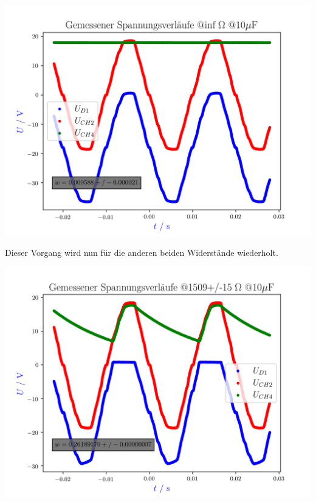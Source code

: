 \documentclass[11pt,ngerman]{scrartcl}
\begin{document}
\begin{center}
	\begin{minipage}[t]{0.8\textwidth}
		\includegraphics[width=\textwidth]{./figures/halbleiter/Versuch3/spannunginf.png}
		\label{fig:spannunginf}
	\end{minipage}
\end{center}

Dieser Vorgang wird nun für die anderen beiden Widerstände wiederholt.

\begin{center}
	\begin{minipage}[t]{0.8\textwidth}
		\includegraphics[width=\textwidth]{./figures/halbleiter/Versuch3/spannung1509.0.png}
		\label{fig:spannung1509}
	\end{minipage}
\end{center}
\end{document}
